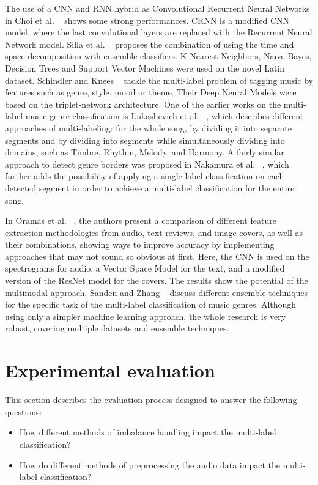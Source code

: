 \documentclass[runningheads]{llncs}
\begin{document}
The use of a CNN and RNN hybrid as Convolutional Recurrent Neural Networks in Choi et al. ~\cite{cnn_recurrent} shows some strong performances. CRNN is a modified CNN model, where the last convolutional layers are replaced with the Recurrent Neural Network model. Silla et al. ~\cite{genre_classification_ml_2} proposes the combination of using the time and space decomposition with ensemble classifiers. K-Nearest Neighbors, Naïve-Bayes, Decision Trees and Support Vector Machines were used on the novel Latin dataset. Schindler and Knees ~\cite{schindler2019multi} tackle the multi-label problem of tagging music by features such as genre, style, mood or theme. Their Deep Neural Models were based on the triplet-network architecture.
 One of the earlier works on the multi-label music genre classification is Lukashevich et al. ~\cite{genre_multi_domain}, which describes different approaches of multi-labeling: for the whole song, by dividing it into separate segments and by dividing into segments while simultaneously dividing into domains, such as Timbre, Rhythm, Melody, and Harmony. A fairly similar approach to detect genre borders was proposed in Nakamura et al. ~\cite{genre_multi_border}, which further adds the possibility of applying a single label classification on each detected segment in order to achieve a multi-label classification for the entire song. 

In Oramas et al. ~\cite{genre_multi_source}, the authors present a comparison of different feature extraction methodologies from audio, text reviews, and image covers, as well as their combinations, showing ways to improve accuracy by implementing approaches that may not sound so obvious at first. Here, the CNN is used on the spectrograms for audio, a Vector Space Model for the text, and a modified version of the ResNet model for the covers. The results show the potential of the multimodal approach. Sanden and Zhang ~\cite{sanden2011enhancing} discuss different ensemble techniques for the specific task of the multi-label classification of music genres. Although using only a simpler machine learning approach, the whole research is very robust, covering multiple datasets and ensemble techniques.

\section{Experimental evaluation}
This section describes the evaluation process designed to answer the following questions:
\begin{itemize}
    \item How different methods of imbalance handling impact the multi-label classification?
    \item How do different methods of preprocessing the audio data impact the multi-label classification?
\end{itemize}
\end{document}
